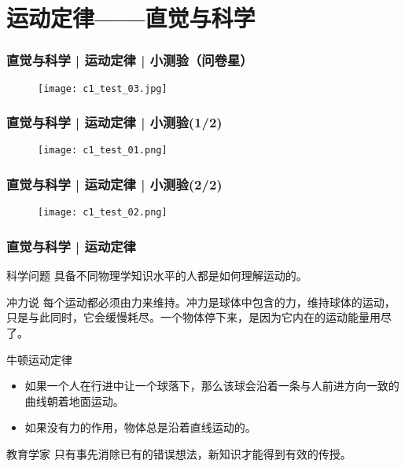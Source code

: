 \section{运动定律——直觉与科学}
\begin{frame}
  \frametitle{直觉与科学 | 运动定律 | 小测验（问卷星）}
  \begin{figure}
    \centering
    \texttt{[image: c1\_test\_03.jpg]}
  \end{figure}
\end{frame}

\begin{frame}
  \frametitle{直觉与科学 | 运动定律 | 小测验(1/2)}
  \begin{figure}
    \centering
    \texttt{[image: c1\_test\_01.png]}
  \end{figure}
\end{frame}

\begin{frame}
  \frametitle{直觉与科学 | 运动定律 | 小测验(2/2)}
  \begin{figure}
    \centering
    \texttt{[image: c1\_test\_02.png]}
  \end{figure}
\end{frame}

\begin{frame}
  \frametitle{直觉与科学 | 运动定律}
  \begin{block}{科学问题}
    具备不同物理学知识水平的人都是如何理解运动的。
  \end{block}
  \pause
  \begin{block}{冲力说}
    每个运动都必须由力来维持。冲力是球体中包含的力，维持球体的运动，只是与此同时，它会缓慢耗尽。一个物体停下来，是因为它内在的运动能量用尽了。
  \end{block}
  \pause
  \begin{block}{牛顿运动定律}
    \begin{itemize}
      \item 如果一个人在行进中让一个球落下，那么该球会沿着一条与人前进方向一致的曲线朝着地面运动。
      \item 如果没有力的作用，物体总是沿着直线运动的。
    \end{itemize}
  \end{block}
  \pause
  \begin{block}{教育学家}
    只有事先消除已有的错误想法，新知识才能得到有效的传授。
  \end{block}
\end{frame}

